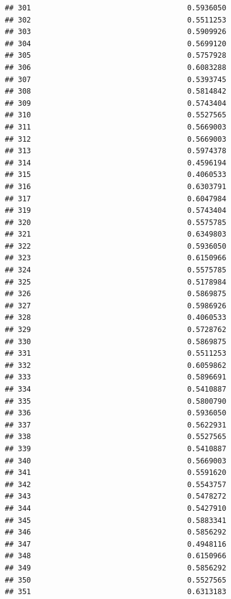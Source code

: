 \documentclass[
  american,
  man,floatsintext]{apa7}
\begin{document}
\begin{verbatim}
## 301                                    0.5936050
## 302                                    0.5511253
## 303                                    0.5909926
## 304                                    0.5699120
## 305                                    0.5757928
## 306                                    0.6083288
## 307                                    0.5393745
## 308                                    0.5814842
## 309                                    0.5743404
## 310                                    0.5527565
## 311                                    0.5669003
## 312                                    0.5669003
## 313                                    0.5974378
## 314                                    0.4596194
## 315                                    0.4060533
## 316                                    0.6303791
## 317                                    0.6047984
## 319                                    0.5743404
## 320                                    0.5575785
## 321                                    0.6349803
## 322                                    0.5936050
## 323                                    0.6150966
## 324                                    0.5575785
## 325                                    0.5178984
## 326                                    0.5869875
## 327                                    0.5986926
## 328                                    0.4060533
## 329                                    0.5728762
## 330                                    0.5869875
## 331                                    0.5511253
## 332                                    0.6059862
## 333                                    0.5896691
## 334                                    0.5410887
## 335                                    0.5800790
## 336                                    0.5936050
## 337                                    0.5622931
## 338                                    0.5527565
## 339                                    0.5410887
## 340                                    0.5669003
## 341                                    0.5591620
## 342                                    0.5543757
## 343                                    0.5478272
## 344                                    0.5427910
## 345                                    0.5883341
## 346                                    0.5856292
## 347                                    0.4948116
## 348                                    0.6150966
## 349                                    0.5856292
## 350                                    0.5527565
## 351                                    0.6313183

\end{verbatim}
\end{document}
